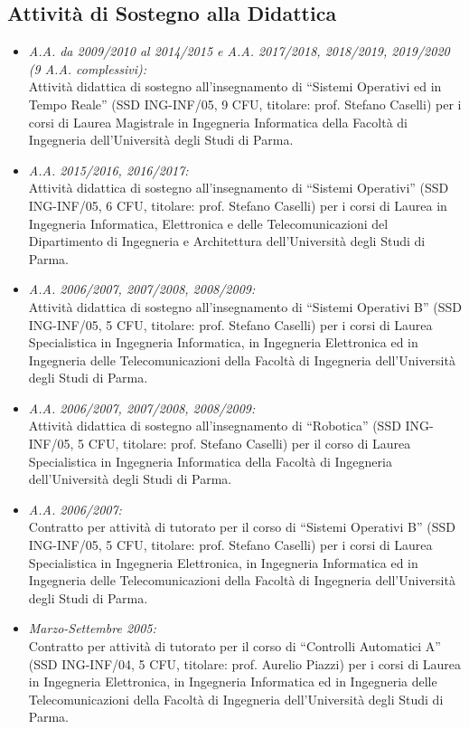 \documentclass[11pt]{article}
\newcommand{\ITEMDATE}[1]{\item \textit{#1:}\\}
\begin{document}
\begin{itemize}
\begin{itemize}
\end{itemize}

\subsection*{Attivit\`a di Sostegno alla Didattica}

\begin{itemize}

\ITEMDATE{A.A. da 2009/2010 al 2014/2015 e A.A. 2017/2018, 2018/2019, 2019/2020 (9 A.A. complessivi)} 
Attivit\`a didattica di sostegno all'insegnamento di ``Sistemi Operativi ed in Tempo Reale'' 
(SSD ING-INF/05, 9 CFU, titolare: prof. Stefano Caselli)
per i corsi di Laurea Magistrale in Ingegneria Informatica
della Facolt\`a di Ingegneria dell'Universit\`a degli Studi di Parma.

\ITEMDATE{A.A. 2015/2016, 2016/2017} 
Attivit\`a didattica di sostegno all'insegnamento di ``Sistemi Operativi'' 
(SSD ING-INF/05, 6 CFU, titolare: prof. Stefano Caselli)
per i corsi di Laurea in Ingegneria Informatica, Elettronica e delle Telecomunicazioni
del Dipartimento di Ingegneria e Architettura dell'Universit\`a degli Studi di Parma.

\ITEMDATE{A.A. 2006/2007, 2007/2008, 2008/2009} 
Attivit\`a didattica di sostegno all'insegnamento di ``Sistemi Operativi B'' (SSD ING-INF/05, 5 CFU, titolare: prof. Stefano Caselli)
per i corsi di Laurea Specialistica in Ingegneria Informatica, in Ingegneria Elettronica ed in Ingegneria delle Telecomunicazioni
della Facolt\`a di Ingegneria dell'Universit\`a degli Studi di Parma.

\ITEMDATE{A.A. 2006/2007, 2007/2008, 2008/2009} 
Attivit\`a didattica di sostegno all'insegnamento di ``Robotica'' (SSD ING-INF/05, 5 CFU, titolare: prof. Stefano Caselli)
per il corso di Laurea Specialistica in Ingegneria Informatica 
della Facolt\`a di Ingegneria dell'Universit\`a degli Studi di Parma.

\ITEMDATE{A.A. 2006/2007} 
Contratto per attivit\`a di tutorato per il corso di ``Sistemi Operativi B'' (SSD ING-INF/05, 5 CFU, titolare: prof. Stefano Caselli)
per i corsi di Laurea Specialistica in Ingegneria Elettronica, in Ingegneria Informatica ed in Ingegneria delle Telecomunicazioni 
della Facolt\`a di Ingegneria dell'Universit\`a degli Studi di Parma.

\ITEMDATE{Marzo-Settembre 2005}
Contratto per attivit\`a di tutorato per il corso di ``Controlli Automatici A'' (SSD ING-INF/04, 5 CFU, titolare: prof. Aurelio Piazzi) 
per i corsi di Laurea in Ingegneria Elettronica, in Ingegneria Informatica ed in Ingegneria delle Telecomunicazioni 
della Facolt\`a di Ingegneria dell'Universit\`a degli Studi di Parma. 
\end{itemize}



\end{itemize}
\end{document}
